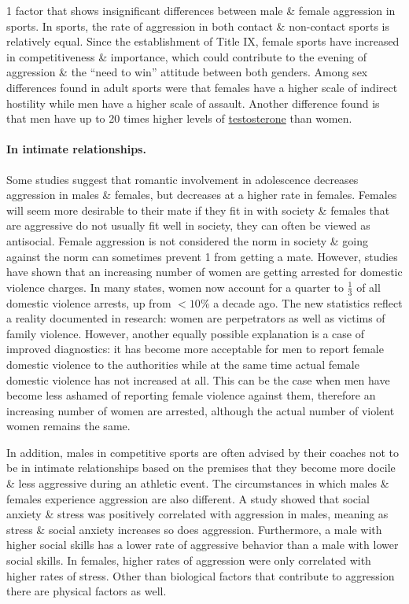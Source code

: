 \documentclass[oneside]{book}
\numberwithin{equation}{section}
\begin{document}
1 factor that shows insignificant differences between male \& female aggression in sports. In sports, the rate of aggression in both contact \& non-contact sports is relatively equal. Since the establishment of Title IX, female sports have increased in competitiveness \& importance, which could contribute to the evening of aggression \& the ``need to win'' attitude between both genders. Among sex differences found in adult sports were that females have a higher scale of indirect hostility while men have a higher scale of assault. Another difference found is that men have up to 20 times higher levels of \href{https://en.wikipedia.org/wiki/Testosterone}{testosterone} than women. 

\paragraph{In intimate relationships.} Some studies suggest that romantic involvement in adolescence decreases aggression in males \& females, but decreases at a higher rate in females. Females will seem more desirable to their mate if they fit in with society \& females that are aggressive do not usually fit well in society, they can often be viewed as antisocial. Female aggression is not considered the norm in society \& going against the norm can sometimes prevent 1 from getting a mate. However, studies have shown that an increasing number of women are getting arrested for domestic violence charges. In many states, women now account for a quarter to $\frac{1}{3}$ of all domestic violence arrests, up from $< 10$\% a decade ago. The new statistics reflect a reality documented in research: women are perpetrators as well as victims of family violence. However, another equally possible explanation is a case of improved diagnostics: it has become more acceptable for men to report female domestic violence to the authorities while at the same time actual female domestic violence has not increased at all. This can be the case when men have become less ashamed of reporting female violence against them, therefore an increasing number of women are arrested, although the actual number of violent women remains the same.

In addition, males in competitive sports are often advised by their coaches not to be in intimate relationships based on the premises that they become more docile \& less aggressive during an athletic event. The circumstances in which males \& females experience aggression are also different. A study showed that social anxiety \& stress was positively correlated with aggression in males, meaning as stress \& social anxiety increases so does aggression. Furthermore, a male with higher social skills has a lower rate of aggressive behavior than a male with lower social skills. In females, higher rates of aggression were only correlated with higher rates of stress. Other than biological factors that contribute to aggression there are physical factors as well.
\end{document}
